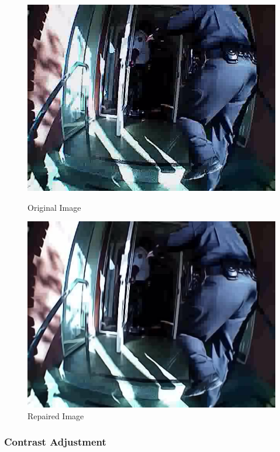 \documentclass[a4paper]{article}
\begin{document}
\begin{figure}[H]
\begin{minipage}[b]{0.12\textwidth}
\includegraphics[trim=7.5cm 4cm 10cm 0cm, clip, width=\textwidth]{00181_29.jpg}
 \caption{Original Image}
 \end{minipage}
  \begin{minipage}[b]{0.12\textwidth}
    \includegraphics[trim=7.5cm 4cm 10cm 0cm, clip, width=\textwidth]{00181_29R.jpg}
    \caption{Repaired Image}
  \end{minipage}
  \hfill
\end{figure}

\subsubsection{Contrast Adjustment}
\end{document}

